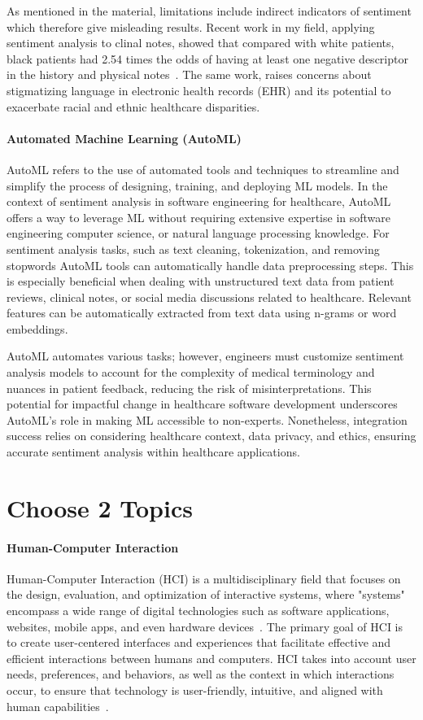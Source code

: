 \documentclass[11pt,runningheads]{article}
\begin{document}
As mentioned in the material, limitations include indirect indicators of sentiment which therefore give misleading results. Recent work in my field, applying sentiment analysis to clinal notes, showed that compared with white patients, black patients had 2.54 times the odds of having at least one negative descriptor in the history and physical notes~\cite{sun2022negative}. The same work, raises concerns about stigmatizing language in electronic health records (EHR) and its potential to exacerbate racial and ethnic healthcare disparities. 


\paragraph{Automated Machine Learning (AutoML)}
AutoML refers to the use of automated tools and techniques to streamline and simplify the process of designing, training, and deploying ML models. In the context of sentiment analysis in software engineering for healthcare, AutoML offers a way to leverage ML without requiring extensive expertise in software engineering computer science, or natural language processing knowledge. 
For sentiment analysis tasks, such as text cleaning, tokenization, and removing stopwords AutoML tools can automatically handle data preprocessing steps. This is especially beneficial when dealing with unstructured text data from patient reviews, clinical notes, or social media discussions related to healthcare. Relevant features can be automatically extracted from text data using n-grams or word embeddings. 

AutoML automates various tasks; however, engineers must customize sentiment analysis models to account for the complexity of medical terminology and nuances in patient feedback, reducing the risk of misinterpretations. This potential for impactful change in healthcare software development underscores AutoML's role in making ML accessible to non-experts. Nonetheless, integration success relies on considering healthcare context, data privacy, and ethics, ensuring accurate sentiment analysis within healthcare applications.

\section{Choose 2 Topics}
\paragraph{Human-Computer Interaction}
Human-Computer Interaction (HCI) is a multidisciplinary field that focuses on the design, evaluation, and optimization of interactive systems, where "systems" encompass a wide range of digital technologies such as software applications, websites, mobile apps, and even hardware devices~\cite{ren2020review}. The primary goal of HCI is to create user-centered interfaces and experiences that facilitate effective and efficient interactions between humans and computers. HCI takes into account user needs, preferences, and behaviors, as well as the context in which interactions occur, to ensure that technology is user-friendly, intuitive, and aligned with human capabilities~\cite{ren2020review}.
\end{document}

